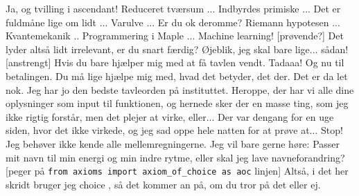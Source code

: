 \documentclass[a4paper,11pt]{article}
\begin{document}
\begin{sketch}
 Ja, og tvilling i ascendant!
 Reduceret tværsum ... Indbyrdes primiske ... Det er fuldmåne lige om lidt ... Varulve ... 
 Er du ok deromme?
 Riemann hypotesen ... Kvantemekanik .. Programmering i Maple ... Machine learning! 
[prøvende?] Det lyder altså lidt irrelevant, er du snart færdig?
 Øjeblik, jeg skal bare lige... sådan!
[anstrengt] Hvis du bare hjælper mig med at få tavlen vendt.
 Tadaaa! Og nu til betalingen.
 Du må lige hjælpe mig med, hvad det betyder, det der. 
 Det er da let nok. Jeg har jo den bedste tavleorden på instituttet. 
 Heroppe, der har vi alle dine oplysninger som input til funktionen, og hernede sker der en masse ting, som jeg ikke rigtig forstår, men det plejer at virke, eller... Der var dengang for en uge siden, hvor det ikke virkede, og jeg sad oppe hele natten for at prøve at...
 Stop! Jeg behøver ikke kende alle mellemregningerne. Jeg vil bare gerne høre: Passer mit navn til min energi og min indre rytme, eller skal jeg lave navneforandring?
[peger på \texttt{from axioms import axiom\_of\_choice as aoc} linjen] Altså, i det her skridt bruger jeg choice , så det kommer an på, om du tror på det eller ej.
\end{sketch}
\end{document}
